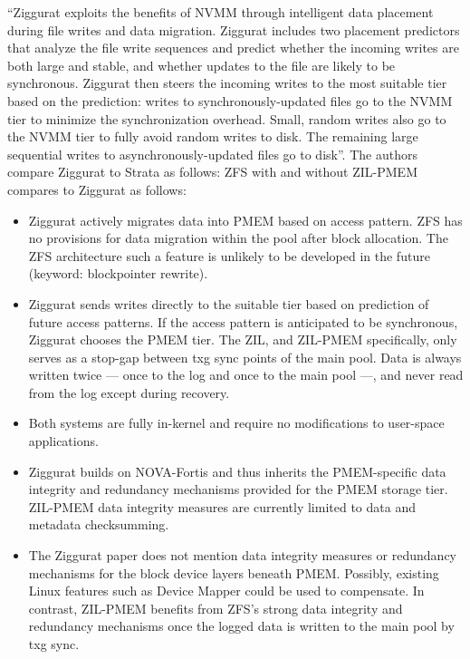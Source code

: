 \documentclass[12pt,a4paper,twoside]{book}
\begin{document}
``Ziggurat exploits the benefits of NVMM through intelligent data placement during file writes and data migration.
Ziggurat includes two placement predictors that analyze the file write sequences and predict whether the incoming writes are both large and stable, and whether updates to the file are likely to be synchronous.
Ziggurat then steers the incoming writes to the most suitable tier based on the prediction: writes to synchronously-updated files go to the NVMM tier to minimize the synchronization overhead.
Small, random writes also go to the NVMM tier to fully avoid random writes to disk. The remaining large sequential writes to asynchronously-updated files go to disk''.
The authors compare Ziggurat to Strata as follows:
ZFS with and without ZIL-PMEM compares to Ziggurat as follows:
\begin{itemize}[noitemsep,beginpenalty=100000,midpenalty=100000]
    \item Ziggurat actively migrates data into PMEM based on access pattern.
          ZFS has no provisions for data migration within the pool after block allocation.
          The ZFS architecture such a feature is unlikely to be developed in the future (keyword: blockpointer rewrite).
    \item Ziggurat sends writes directly to the suitable tier based on prediction of future access patterns.
          If the access pattern is anticipated to be synchronous, Ziggurat chooses the PMEM tier.
          The ZIL, and ZIL-PMEM specifically, only serves as a stop-gap between txg sync points of the main pool.
          Data is always written twice --- once to the log and once to the main pool ---, and never read from the log except during recovery.
    \item Both systems are fully in-kernel and require no modifications to user-space applications.
    \item Ziggurat builds on NOVA-Fortis and thus inherits the PMEM-specific data integrity and redundancy mechanisms provided for the PMEM storage tier.
          ZIL-PMEM data integrity measures are currently limited to data and metadata checksumming.
    \item The Ziggurat paper does not mention data integrity measures or redundancy mechanisms for the block device layers beneath PMEM.
          Possibly, existing Linux features such as Device Mapper could be used to compensate.
          In contrast, ZIL-PMEM benefits from ZFS’s strong data integrity and redundancy mechanisms once the logged data is written to the main pool by txg sync.

\end{itemize}
\end{document}
